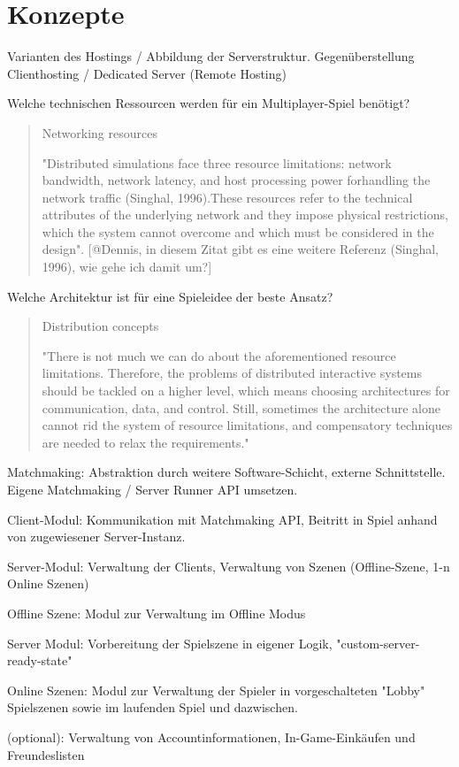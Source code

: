 \chapter{Konzepte}
\label{sec:konzepte}

Varianten des Hostings / Abbildung der Serverstruktur. Gegenüberstellung Clienthosting / Dedicated Server (Remote Hosting)

Welche technischen Ressourcen werden für ein Multiplayer-Spiel benötigt?

\begin{quote}
	Networking resources
	
	"Distributed simulations face three resource limitations: network bandwidth, network 
	latency, and host processing power forhandling the network traffic (Singhal, 1996).These resources refer to the technical attributes of the underlying network and they impose physical restrictions, which the system cannot overcome and which must be considered in the design". \cite{Smed.2002} [@Dennis, in diesem Zitat gibt es eine weitere Referenz (Singhal, 1996), wie gehe ich damit um?]
\end{quote}

Welche Architektur ist für eine Spieleidee der beste Ansatz? 

\begin{quote}
	Distribution concepts
	
	"There is not much we can do about the aforementioned resource limitations. Therefore, the problems of distributed interactive systems should be tackled on a higher level, which means choosing architectures for communication, data, and control. Still, sometimes the architecture alone cannot rid the system of resource limitations, and compensatory techniques are needed to relax the requirements." \cite{Smed.2002}
\end{quote}

Matchmaking: Abstraktion durch weitere Software-Schicht, externe Schnittstelle. Eigene Matchmaking / Server Runner API umsetzen.

Client-Modul: Kommunikation mit Matchmaking API, Beitritt in Spiel anhand von zugewiesener Server-Instanz.

Server-Modul: Verwaltung der Clients, Verwaltung von Szenen (Offline-Szene, 1-n Online Szenen)

Offline Szene: Modul zur Verwaltung im Offline Modus

Server Modul: Vorbereitung der Spielszene in eigener Logik, "custom-server-ready-state"

Online Szenen: Modul zur Verwaltung der Spieler in vorgeschalteten "Lobby" Spielszenen sowie im laufenden Spiel und dazwischen.

(optional): Verwaltung von Accountinformationen, In-Game-Einkäufen und Freundeslisten